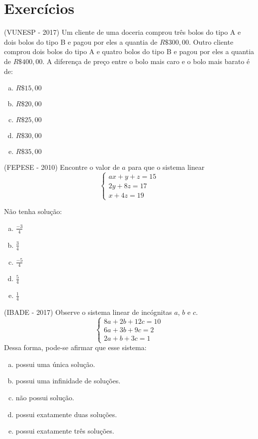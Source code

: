 \section{Exercícios}

\begin{exer}
(VUNESP - 2017) Um cliente de uma doceria comprou três bolos do tipo A e dois bolos do tipo B e pagou por eles a quantia de $R\$ 300,00$. Outro cliente comprou dois bolos do tipo A e quatro bolos do tipo B e pagou por eles a quantia de $R\$ 400,00$. A diferença de preço entre o bolo mais caro e o bolo mais barato é de:
 \begin{enumerate}[a)]
 \item $R\$ 15,00$
 \item $R\$ 20,00$
 \item $R\$ 25,00$
 \item $R\$ 30,00$
 \item $R\$ 35,00$
 \end{enumerate}
 \end{exer}

 \begin{exer}
 (FEPESE - 2010) Encontre o valor de $a$ para que o sistema linear
 \[ \begin{cases}
 ax+y+z= 15 \\
 2y + 8z= 17 \\
 x + 4z= 19
 \end{cases} \]

 Não tenha solução:
 \begin{enumerate}[a)]
\item $\frac{-3}{4}$
\item $\frac{3}{4}$
\item $\frac{-5}{4}$
\item $\frac{5}{4}$
\item $\frac{1}{4}$
\end{enumerate}
\end{exer}

 \begin{exer}
 (IBADE - 2017) Observe o sistema linear de incógnitas $a$, $b$ e $c$.
 \[ \begin{cases}
 8a + 2b + 12c= 10 \\
 6a + 3b + 9c= 2 \\
 2a + b + 3c= 1
 \end{cases} \]
 Dessa forma, pode-se afirmar que esse sistema:
\begin{enumerate}[a)]
\item possui uma única solução.
\item possui uma infinidade de soluções.
\item não possui solução.
\item possui exatamente duas soluções.
\item possui exatamente três soluções.
\end{enumerate}
\end{exer}

